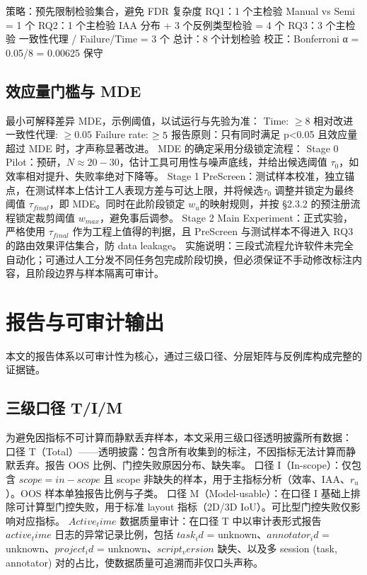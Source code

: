 \documentclass[journal,onecolumn]{IEEEtran}
\begin{document}
策略：预先限制检验集合，避免 FDR 复杂度
RQ1：1 个主检验 Manual vs Semi = 1 个
RQ2：1 个主检验 IAA 分布 + 3 个反例类型检验 = 4 个
RQ3：3 个主检验 一致性代理 / Failure/Time = 3 个
总计：8 个计划检验
校正：Bonferroni α = 0.05/8 = 0.00625 保守
\subsection{效应量门槛与 MDE}

最小可解释差异 MDE，示例阈值，以试运行与先验为准：
Time: $\geq8$ 相对改进
一致性代理: $\geq0.05$
Failure rate: $\geq5\\$%
报告原则：只有同时满足 p<0.05 且效应量超过 MDE 时，才声称显著改进。
MDE 的确定采用分级锁定流程：
Stage 0 Pilot：预研，$N\approx20-30$，估计工具可用性与噪声底线，并给出候选阈值 $\tau_{0}$，如效率相对提升、失败率绝对下降等。
Stage 1 PreScreen：测试样本校准，独立锚点，在测试样本上估计工人表现方差与可达上限，并将候选$\tau_0$ 调整并锁定为最终阈值 $\tau_{final}$，即 MDE。同时在此阶段锁定 $w_u$的映射规则，并按 §2.3.2 的预注册流程锁定裁剪阈值 $w_{max}$，避免事后调参。
Stage 2 Main Experiment：正式实验，严格使用 $\tau_{final}$ 作为工程上值得的判据，且 PreScreen 与测试样本不得进入 RQ3 的路由效果评估集合，防 data leakage。
实施说明：三段式流程允许软件未完全自动化；可通过人工分发不同任务包完成阶段切换，但必须保证不手动修改标注内容，且阶段边界与样本隔离可审计。

\section{报告与可审计输出}

本文的报告体系以可审计性为核心，通过三级口径、分层矩阵与反例库构成完整的证据链。
\subsection{三级口径 T/I/M}

为避免因指标不可计算而静默丢弃样本，本文采用三级口径透明披露所有数据：
口径 T（Total）——透明披露：包含所有收集到的标注，不因指标无法计算而静默丢弃。报告 OOS 比例、门控失败原因分布、缺失率。
口径 I（In-scope）：仅包含 $scope=in-scope$ 且 scope 非缺失的样本，用于主指标分析（效率、IAA、$r_{u}$）。OOS 样本单独报告比例与子类。
口径 M（Model-usable）：在口径 I 基础上排除可计算型门控失败，用于标准 layout 指标（2D/3D IoU）。可比型门控失败仅影响对应指标。
$Active_time$ 数据质量审计：在口径 T 中以审计表形式报告 $active_time$ 日志的异常记录比例，包括 $task_id$ = unknown、$annotator_id$ = unknown、$project_id$ = unknown、$script_version$ 缺失、以及多 session (task, annotator) 对的占比，使数据质量可追溯而非仅口头声称。
\end{document}
